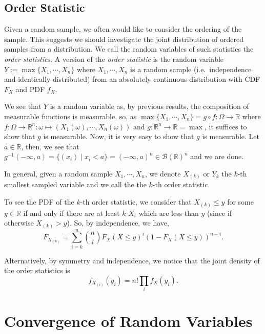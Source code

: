 \documentclass[
]{article}
\theoremstyle{definition}
\begin{document}
\hypertarget{order-statistic}{%
\subsection{Order Statistic}\label{order-statistic}}

Given a random sample, we often would like to consider the ordering of
the sample. This suggests we should investigate the joint distribution
of ordered samples from a distribution. We call the random variables of
such statistics the \emph{order statistics}. A version of the
\emph{order statistic} is the random variable
\(Y := \max\{X_1, \cdots, X_n\}\) where \(X_1, \cdots, X_n\) is a random
sample (i.e.~independence and identically distributed) from an
absolutely continuous distribution with CDF \(F_X\) and PDF \(f_X\).

We see that \(Y\) is a random variable as, by previous results, the
composition of measurable functions is measurable, so, as
\(\max\{X_1, \cdots, X_n\} = g \circ f : \Omega \to \mathbb{R}\) where
\(f : \Omega \to \mathbb{R}^n : \omega \mapsto (X_1(\omega), \cdots, X_n(\omega))\)
and \(g : \mathbb{R}^n \to \mathbb{R} = \max\), it suffices to show that
\(g\) is measurable. Now, it is very easy to show that \(g\) is
measurable. Let \(a \in \mathbb{R}\), then, we see that
\(g^{-1}(-\infty, a) = \{(x_i) \mid x_i < a\} = (-\infty, a)^n \in \mathcal{B}(\mathbb{R})^n\)
and we are done.

In general, given a random sample \(X_1, \cdots, X_n\), we denote
\(X_{(k)}\) or \(Y_k\) the \(k\)-th smallest sampled variable and we
call the the \(k\)-th order statistic.

To see the PDF of the \(k\)-th order statistic, we consider that
\(X_{(k)} \le y\) for some \(y \in \mathbb{R}\) if and only if there are
at least \(k\) \(X_i\) which are less than \(y\) (since if otherwise
\(X_{(k)} > y\)). So, by independence, we have,
\[F_{X_{(k)}} = \sum_{i = k}^n \binom{n}{i}F_X(X \le y)^i(1 - F_X(X \le y))^{n - i}.\]

Alternatively, by symmetry and independence, we notice that the joint
density of the order statistics is
\[f_{X_{(i)}}(y_i) = n! \prod_i f_X(y_i).\]

\newpage

\hypertarget{convergence-of-random-variables}{%
\section{Convergence of Random
Variables}\label{convergence-of-random-variables}}
\end{document}
